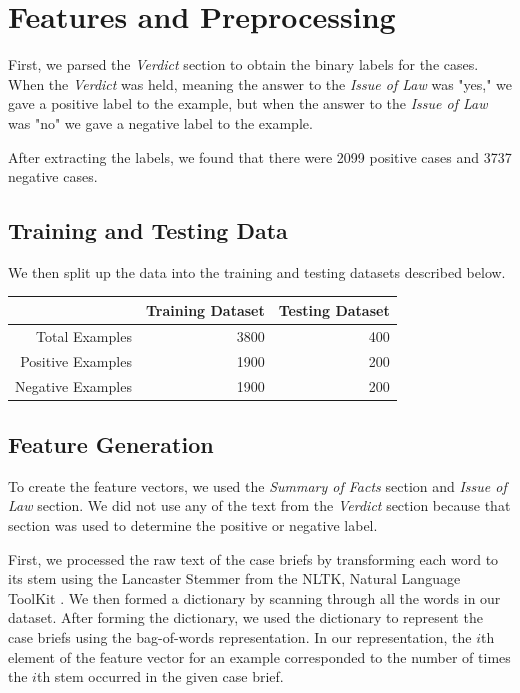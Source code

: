 \documentclass[journal]{IEEEtran}
\begin{document}
\section{Features and Preprocessing}

First, we parsed the \textit{Verdict} section to obtain the binary labels for the cases. When the \textit{Verdict} was held, meaning the answer to the \textit{Issue of Law} was "yes," we gave a positive label to the example, but when the answer to the \textit{Issue of Law} was "no" we gave a negative label to the example. 

After extracting the labels, we found that there were 2099 positive cases and 3737 negative cases.

\subsection{Training and Testing Data}

We then split up the data into the training and testing datasets described below.

\begin{table}[ht]
\centering
\begin{tabular}{rrr}
  \hline
& Training Dataset &	Testing Dataset\\
  \hline
Total Examples&	3800&	400 \\
Positive Examples &	1900 &	200 \\
Negative Examples &	1900 &	200 \\
   \hline
\end{tabular}
\end{table}

\subsection{Feature Generation}

To create the feature vectors, we used the \textit{Summary of Facts} section and \textit{Issue of Law} section. We did not use any of the text from the \textit{Verdict} section because that section was used to determine the positive or negative label.

First, we processed the raw text of the case briefs by transforming each word to its stem using the Lancaster Stemmer from the NLTK, Natural Language ToolKit \cite{Loper:2002:NNL:1118108.1118117}. We then formed a dictionary by scanning through all the words in our dataset. After forming the dictionary, we used the dictionary to represent the case briefs using the bag-of-words representation. In our representation, the $i$th element of the feature vector for an example corresponded to the number of times the $i$th stem occurred in the given case brief.
\end{document}
